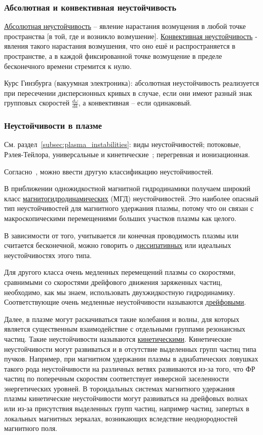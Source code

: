 \documentclass[10pt, a4paper]{article}
\begin{document}
\subsubsection{Абсолютная и конвективная неустойчивость}

\uline{Абсолютная неустойчивость} -- явление нарастания возмущения в любой точке пространства [в той, где и возникло возмушение]. \uline{Конвективная неустойчивость} - явления такого нарастания возмушения, что оно ешё и распространяется в пространстве, а в каждой фиксированной точке возмущение в пределе бесконечного времени стремится к нулю.

Курс Гинзбурга (вакуумная электроника): абсолютная неустойчивость реализуется при пересечении дисперсионных кривых в случае, если они имеют разный знак групповых скоростей $\frac {d\omega}{dk}$, а конвективная -- если одинаковый.

\subsubsection{Неустойчивости в плазме} \label{subsec:plasma_B_instabilities}

См. раздел~\ref{subsec:plasma_instabilities}: виды неустойчивостей; потоковые, Рэлея-Тейлора, универсальные и кинетические~\cite{chen}; перегревная и ионизационная.

Согласно~\cite{kadomtsev}, можно ввести другую классификацию неустойчивостей.

В приближении одножидкостной магнитной гидродинамики получаем широкий класс \linebreak \uline{магнитогидродинамических} (МГД) неустойчивостей. Это наиболее опасный тип неустойчивостей для магнитного удержания плазмы, потому что он связан с макроскопическими перемещениями больших участков плазмы как целого.

В зависимости от того, учитывается ли конечная проводимость плазмы или считается бесконечной, можно говорить о \uline{диссипативных} или идеальных неустойчивостях этого типа.

Для другого класса очень медленных перемещений плазмы со скоростями, сравнимыми со скоростями дрейфового движения заряженных частиц, необходимо, как мы знаем, использовать двухжидкостную гидродинамику. Соответствующие очень медленные неустойчивости называются \linebreak\uline{дрейфовыми}.

Далее, в плазме могут раскачиваться такие колебания и волны, для которых является существенным взаимодействие с отдельными группами резонансных частиц. Такие неустойчивости называются \uline{кинетическими}. Кинетические неустойчивости могут развиваться и в отсутствие выделенных групп частиц типа пучков. Например, при магнитном удержании плазмы в адиабатических ловушках такого рода неустойчивости на различных ветвях развиваются из-за того, что ФР частиц по поперечным скоростям соответствует инверсной заселенности энергетических уровней. В тороидальных системах магнитного удержания плазмы кинетические неустойчивости могут развиваться на дрейфовых волнах или из-за присутствия выделенных групп частиц, например частиц, запертых в локальных магнитных зеркалах, возникающих вследствие неоднородностей магнитного поля.
\end{document}
